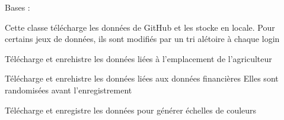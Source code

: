 \documentclass[letterpaper,10pt,french]{sphinxmanual}
\begin{document}
\begin{fulllineitems}
\label{\detokenize{agri_data:agri_data.data_draw.RandomDraw}}
\sphinxAtStartPar
Bases : 

\sphinxAtStartPar
Cette classe télécharge les données de GitHub et les stocke en locale. Pour certains jeux de données, ils sont modifiés par un tri
alétoire à chaque login

\begin{fulllineitems}
\label{\detokenize{agri_data:agri_data.data_draw.RandomDraw.data_agri}}
\sphinxAtStartPar
Télécharge et enrehistre les données liées à l’emplacement de l’agriculteur

\end{fulllineitems}


\begin{fulllineitems}
\label{\detokenize{agri_data:agri_data.data_draw.RandomDraw.financial_data}}
\sphinxAtStartPar
Télécharge et enrehistre les données liées aux données financières
Elles sont randomisées avant l’enregistrement

\end{fulllineitems}


\begin{fulllineitems}
\label{\detokenize{agri_data:agri_data.data_draw.RandomDraw.gauges_val}}
\sphinxAtStartPar
Télécharge et enregistre les données pour générer échelles de couleurs

\end{fulllineitems}



\end{fulllineitems}
\end{document}
